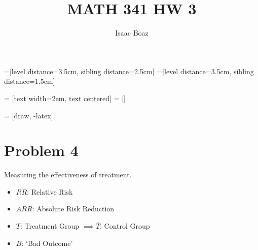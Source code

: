 \documentclass{article}
\title{\vspace{-5ex}MATH 341 HW 3}
\author{Isaac Boaz}
\begin{document}
=[level distance=3.5cm, sibling distance=2.5cm]
=[level distance=3.5cm, sibling distance=1.5cm]

 = [text width=2em, text centered]
 = []

 = [draw, -latex]

\maketitle

\section*{Problem 4}
Measuring the effectiveness of treatment.
\begin{itemize}[noitemsep]
    \item \(RR\): Relative Risk
    \item \(ARR\): Absolute Risk Reduction
    \item \(T\): Treatment Group \(\implies \overline{T}\): Control Group
    \item \(B\): `Bad Outcome'
\end{itemize}
\end{document}
